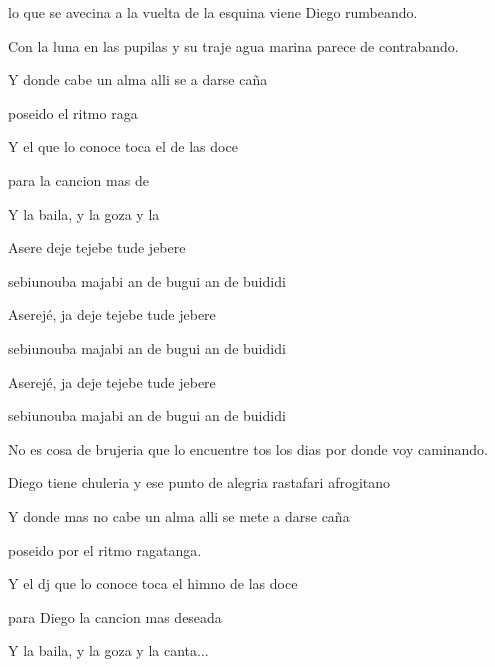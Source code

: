 

\zs
{} lo que se avecina a la vuelta de la esquina viene Diego rumbeando.

Con la luna en las pupilas y su traje agua marina parece de contrabando.


Y donde  cabe un alma alli se  a darse caña

poseido  el ritmo raga

Y el  que lo conoce toca el  de las doce

para  la cancion mas de

Y la baila, y la goza y la 
\ks

\zr
Asere deje tejebe tude jebere

sebiunouba majabi an de bugui an de buididi

Aserejé, ja deje tejebe tude jebere

sebiunouba majabi an de bugui an de buididi

Aserejé, ja deje tejebe tude jebere

sebiunouba majabi an de bugui an de buididi
\kr

\zs
No es cosa de brujeria
que lo encuentre tos los dias
por donde voy caminando.

Diego tiene chuleria
y ese punto de alegria
rastafari afrogitano

Y donde mas no cabe un alma alli se mete a darse caña

poseido por el ritmo ragatanga.

Y el dj que lo conoce toca el himno de las doce

para Diego la cancion mas deseada

Y la baila, y la goza y la canta...
\ks

\zr
\kr

\kp


